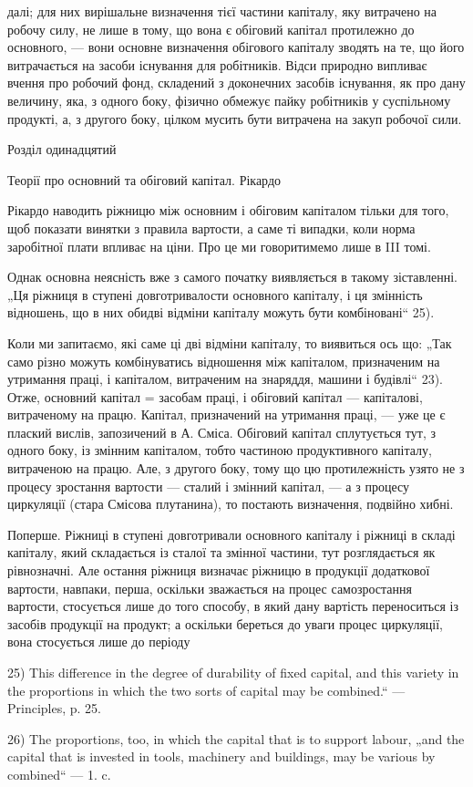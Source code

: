 далі; для них вирішальне визначення тієї частини капіталу, яку витрачено
на робочу силу, не лише в тому, що вона є обіговий капітал протилежно
до основного, — вони основне визначення обігового капіталу зводять
на те, що його витрачається на засоби існування для робітників.
Відси природно випливає вчення про робочий фонд, складений з доконечних
засобів існування, як про дану величину, яка, з одного боку,
фізично обмежує пайку робітників у суспільному продукті, а, з другого
боку, цілком мусить бути витрачена на закуп робочої сили.

Розділ одинадцятий

Теорії про основний та обіговий капітал. Рікардо

Рікардо наводить ріжницю між основним і обіговим капіталом тільки
для того, щоб показати винятки з правила вартости, а саме ті випадки,
коли норма заробітної плати впливає на ціни. Про це ми говоритимемо
лише в III томі.

Однак основна неясність вже з самого початку виявляється в такому
зіставленні. „Ця ріжниця в ступені довготривалости основного капіталу,
і ця змінність відношень, що в них обидві відміни капіталу можуть бути
комбіновані“ 25).

Коли ми запитаємо, які саме ці дві відміни капіталу, то виявиться ось
що: „Так само різно можуть комбінуватись відношення між капіталом,
призначеним на утримання праці, і капіталом, витраченим на знаряддя,
машини і будівлі“ 23). Отже, основний капітал = засобам праці, і обіговий
капітал — капіталові, витраченому на працю. Капітал, призначений на
утримання праці, — уже це є плаский вислів, запозичений в А. Сміса.
Обіговий капітал сплутується тут, з одного боку, із змінним капіталом,
тобто частиною продуктивного капіталу, витраченою на працю. Але,
з другого боку, тому що цю протилежність узято не з процесу зростання
вартости — сталий і змінний капітал, — а з процесу циркуляції (стара Смісова
плутанина), то постають визначення, подвійно хибні.

Поперше. Ріжниці в ступені довготривали основного капіталу і
ріжниці в складі капіталу, який складається із сталої та змінної частини,
тут розглядається як рівнозначні. Але остання ріжниця визначає ріжницю
в продукції додаткової вартости, навпаки, перша, оскільки зважається на
процес самозростання вартости, стосується лише до того способу, в який
дану вартість переноситься із засобів продукції на продукт; а оскільки
береться до уваги процес циркуляції, вона стосується лише до періоду

25) This difference in the degree of durability of fixed capital, and this variety
in the proportions in which the two sorts of capital may be combined.“ — Principles,
p. 25.

26) The proportions, too, in which the capital that is to support labour, „and the
capital that is invested in tools, machinery and buildings, may be various by combined“
— 1. c.

